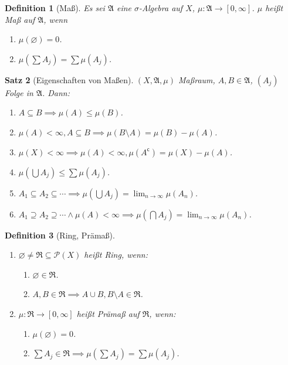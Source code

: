 \documentclass[a4paper]{article}
\newcounter{Sec}
\theoremstyle{marginbreak}
\newtheorem{definition}{Definition}[Sec]
\newtheorem{satz}[definition]{Satz}
\renewcommand{\P}{\mathcal{P}}
\newcommand{\A}{\mathfrak{A}}
\newcommand{\compl}[1]{#1^\mathsf{c}}
\newcommand{\sa}{$\sigma$-Algebra}
\newcommand{\Ri}{\mathfrak{R}}
\begin{document}
	\begin{definition}[Maß]
		Es sei $\A$ eine \sa{} auf $X$, $\mu\colon\A\to[0,\infty]$. $\mu$ heißt Maß auf $\A$, wenn
		\begin{enumerate}[label=($M_{\arabic*}$)]
			\item $\mu(\varnothing)=0$.
			\item $\mu(\sum A_j) = \sum\mu(A_j)$.
		\end{enumerate}
	\end{definition}
	\begin{satz}[Eigenschaften von Maßen]
		$(X,\A,\mu)$ Maßraum, $A, B\in\A$, $(A_j)$ Folge in $\A$. Dann:
		\begin{enumerate}[label=(\alph*)]
			\item $A\subseteq B\implies \mu(A)\leq\mu(B)$.
			\item $\mu(A)<\infty, A\subseteq B\implies \mu(B\setminus A)=\mu(B)-\mu(A)$.
			\item $\mu(X)<\infty\implies \mu(A)<\infty, \mu(\compl{A})=\mu(X)-\mu(A)$.
			\item $\mu(\bigcup A_j)\leq\sum\mu(A_j)$.
			\item $A_1\subseteq A_2\subseteq\cdots\implies \mu(\bigcup A_j)=\lim_{n\to\infty}\mu(A_n)$.
			\item $A_1\supseteq A_2\supseteq\cdots\wedge\mu(A)<\infty\implies \mu(\bigcap A_j)=\lim_{n\to\infty}\mu(A_n)$.
		\end{enumerate}
	\end{satz}
	\begin{definition}[Ring, Prämaß]
		\begin{enumerate}[label=(\alph*)]
			\item $\varnothing\neq\Ri\subseteq\P(X)$ heißt Ring, wenn:
			\begin{enumerate}[label=($R_{\arabic*}$)]
				\item $\varnothing\in\Ri$.
				\item $A, B\in \Ri\implies A\cup B, B\setminus A\in\Ri$.
			\end{enumerate}
			\item $\mu\colon\Ri\to[0, \infty]$ heißt Prämaß auf $\Ri$, wenn:
			\begin{enumerate}[label=($M_{\arabic*}$)]
				\item $\mu(\varnothing) = 0$.
				\item $\sum A_j\in\Ri\implies \mu(\sum A_j)=\sum\mu(A_j)$.
			\end{enumerate}
		\end{enumerate}
	\end{definition}
\end{document}
